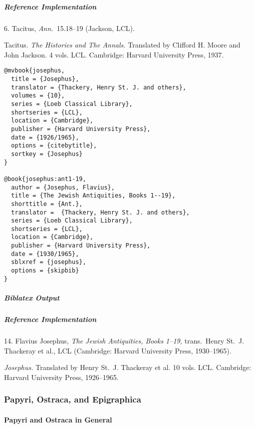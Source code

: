 \documentclass[a4paper]{article}
\newenvironment{biboutput}{%
  \subparagraph{Biblatex Output}
}{\color{black}}
\newenvironment{refimp}{%
  \subparagraph{Reference Implementation}
  \color{reference-colour}
  \rm
}{\par\color{black}}
\begin{document}
\begin{refimp}
  6. Tacitus, \emph{Ann.}\ 15.18–19 (Jackson, LCL).

  \hangindent\bibindent Tacitus. \emph{The Histories and The Annals.}
  Translated by Clifford H. Moore and John Jackson. 4 vols. LCL. Cambridge:
  Harvard University Press, 1937.

\end{refimp}

\medskip

\begin{lstlisting}
@mvbook{josephus,
  title = {Josephus},
  translator = {Thackery, Henry St. J. and others},
  volumes = {10},
  series = {Loeb Classical Library},
  shortseries = {LCL},
  location = {Cambridge},
  publisher = {Harvard University Press},
  date = {1926/1965},
  options = {citebytitle},
  sortkey = {Josephus}
}

@book{josephus:ant1-19,
  author = {Josephus, Flavius},
  title = {The Jewish Antiquities, Books 1--19},
  shorttitle = {Ant.},
  translator =  {Thackery, Henry St. J. and others},
  series = {Loeb Classical Library},
  shortseries = {LCL},
  location = {Cambridge},
  publisher = {Harvard University Press},
  date = {1930/1965},
  sblxref = {josephus},
  options = {skipbib}
}
\end{lstlisting}

\begin{biboutput}
\end{biboutput}

\begin{refimp}
  14. Flavius Josephus, \emph{The Jewish Antiquities, Books 1–19,} trans.\
  Henry St.\ J. Thackeray et al., LCL (Cambridge: Harvard University Press,
  1930–1965).

  \hangindent\bibindent \emph{Josephus.} Translated by Henry St.\ J. Thackeray
  et al. 10 vols. LCL. Cambridge: Harvard University Press, 1926–1965.

\end{refimp}

\subsubsection{Papyri, Ostraca, and Epigraphica}

\paragraph{Papyri and Ostraca in General}
\end{document}
